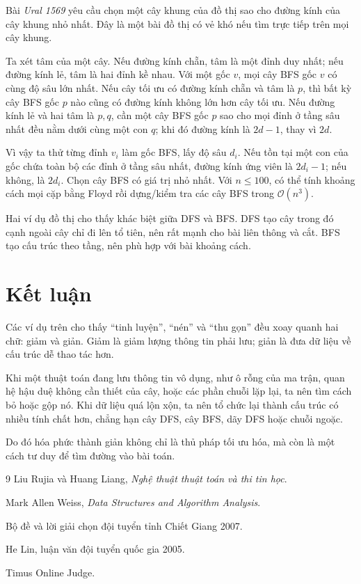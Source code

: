 \documentclass[11pt]{article}
\newcommand{\Oh}{\mathcal{O}}
\begin{document}
Bài \textit{Ural 1569} yêu cầu chọn một cây khung của đồ thị sao cho đường
kính của cây khung nhỏ nhất. Đây là một bài đồ thị có vẻ khó nếu tìm trực tiếp
trên mọi cây khung.

Ta xét tâm của một cây. Nếu đường kính chẵn, tâm là một đỉnh duy nhất; nếu
đường kính lẻ, tâm là hai đỉnh kề nhau. Với một gốc \(v\), mọi cây BFS gốc
\(v\) có cùng độ sâu lớn nhất. Nếu cây tối ưu có đường kính chẵn và tâm là
\(p\), thì bất kỳ cây BFS gốc \(p\) nào cũng có đường kính không lớn hơn cây
tối ưu. Nếu đường kính lẻ và hai tâm là \(p,q\), cần một cây BFS gốc \(p\) sao
cho mọi đỉnh ở tầng sâu nhất đều nằm dưới cùng một con \(q\); khi đó đường
kính là \(2d-1\), thay vì \(2d\).

Vì vậy ta thử từng đỉnh \(v_i\) làm gốc BFS, lấy độ sâu \(d_i\). Nếu tồn tại
một con của gốc chứa toàn bộ các đỉnh ở tầng sâu nhất, đường kính ứng viên là
\(2d_i-1\); nếu không, là \(2d_i\). Chọn cây BFS có giá trị nhỏ nhất. Với
\(n\le 100\), có thể tính khoảng cách mọi cặp bằng Floyd rồi dựng/kiểm tra các
cây BFS trong \(\Oh(n^3)\).

Hai ví dụ đồ thị cho thấy khác biệt giữa DFS và BFS. DFS tạo cây trong đó cạnh
ngoài cây chỉ đi lên tổ tiên, nên rất mạnh cho bài liên thông và cắt. BFS tạo
cấu trúc theo tầng, nên phù hợp với bài khoảng cách.

\section{Kết luận}

Các ví dụ trên cho thấy ``tinh luyện'', ``nén'' và ``thu gọn'' đều xoay quanh
hai chữ: giảm và giản. Giảm là giảm lượng thông tin phải lưu; giản là đưa dữ
liệu về cấu trúc dễ thao tác hơn.

Khi một thuật toán đang lưu thông tin vô dụng, như ô rỗng của ma trận, quan hệ
hậu duệ không cần thiết của cây, hoặc các phần chuỗi lặp lại, ta nên tìm cách
bỏ hoặc gộp nó. Khi dữ liệu quá lộn xộn, ta nên tổ chức lại thành cấu trúc có
nhiều tính chất hơn, chẳng hạn cây DFS, cây BFS, dãy DFS hoặc chuỗi ngoặc.

Do đó hóa phức thành giản không chỉ là thủ pháp tối ưu hóa, mà còn là một cách
tư duy để tìm đường vào bài toán.

\begin{thebibliography}{9}
Liu Rujia và Huang Liang, \textit{Nghệ thuật thuật toán và thi tin học}.

Mark Allen Weiss, \textit{Data Structures and Algorithm Analysis}.

Bộ đề và lời giải chọn đội tuyển tỉnh Chiết Giang 2007.

He Lin, luận văn đội tuyển quốc gia 2005.

Timus Online Judge.
\end{thebibliography}
\end{document}
